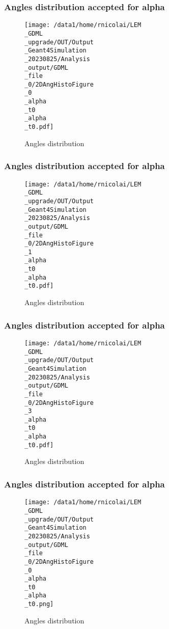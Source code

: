 \documentclass[8pt]{beamer}
\begin{document}
            \begin{frame}
                \frametitle{Angles distribution accepted for alpha}
            
        \begin{figure}[h]
            \centering
            \texttt{[image: /data1/home/rnicolai/LEM\\\_GDML\\\_upgrade/OUT/Output\\\_Geant4Simulation\\\_20230825/Analysis\\\_output/GDML\\\_file\\\_0/2DAngHistoFigure\\\_0\\\_alpha\\\_t0\\\_alpha\\\_t0.pdf]}
            \caption{Angles distribution}
        \end{figure}
        
            \end{frame}
            
            \begin{frame}
                \frametitle{Angles distribution accepted for alpha}
            
        \begin{figure}[h]
            \centering
            \texttt{[image: /data1/home/rnicolai/LEM\\\_GDML\\\_upgrade/OUT/Output\\\_Geant4Simulation\\\_20230825/Analysis\\\_output/GDML\\\_file\\\_0/2DAngHistoFigure\\\_1\\\_alpha\\\_t0\\\_alpha\\\_t0.pdf]}
            \caption{Angles distribution}
        \end{figure}
        
            \end{frame}
            
            \begin{frame}
                \frametitle{Angles distribution accepted for alpha}
            
        \begin{figure}[h]
            \centering
            \texttt{[image: /data1/home/rnicolai/LEM\\\_GDML\\\_upgrade/OUT/Output\\\_Geant4Simulation\\\_20230825/Analysis\\\_output/GDML\\\_file\\\_0/2DAngHistoFigure\\\_3\\\_alpha\\\_t0\\\_alpha\\\_t0.pdf]}
            \caption{Angles distribution}
        \end{figure}
        
            \end{frame}
            
            \begin{frame}
                \frametitle{Angles distribution accepted for alpha}
            
        \begin{figure}[h]
            \centering
            \texttt{[image: /data1/home/rnicolai/LEM\\\_GDML\\\_upgrade/OUT/Output\\\_Geant4Simulation\\\_20230825/Analysis\\\_output/GDML\\\_file\\\_0/2DAngHistoFigure\\\_0\\\_alpha\\\_t0\\\_alpha\\\_t0.png]}
            \caption{Angles distribution}
        \end{figure}
        
            \end{frame}
            
\end{document}
